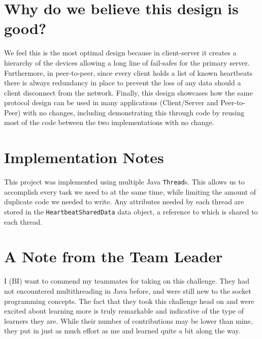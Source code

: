\documentclass[11pt]{article}
\begin{document}
  \section{Why do we believe this design is good?}
  We feel this is the most optimal design because in client-server it creates a 
  hierarchy of the devices allowing a long line of fail-safes for the primary
  server. Furthermore, in peer-to-peer, since every client holds a list of known
  heartbeats there is always redundancy in place to prevent the loss of any
  data should a client disconnect from the network. Finally, this design showcases 
  how the same protocol design can be used in many applications (Client/Server 
  and Peer-to-Peer) with no changes, including demonstrating this through code 
  by reusing most of the code between the two implementations with no change.

  \section{Implementation Notes}
  This project was implemented using multiple Java \texttt{Thread}s. This 
  allows us to accomplish every task we need to at the same time, while 
  limiting the amount of duplicate code we needed to write. Any attributes 
  needed by each thread are stored in the \texttt{HeartbeatSharedData} data 
  object, a reference to which is shared to each thread.

  \section{A Note from the Team Leader}
  I (BI) want to commend my teammates for taking on this challenge. They had 
  not encountered multithreading in Java before, and were still new to the 
  socket programming concepts. The fact that they took this challenge head on 
  and were excited about learning more is truly remarkable and indicative of 
  the type of learners they are. While their number of contributions may be 
  lower than mine, they put in just as much effort as me and learned quite 
  a bit along the way.
\end{document}
